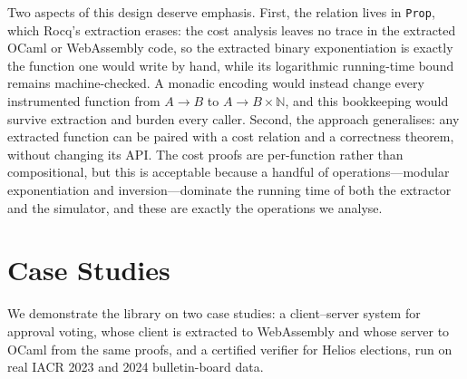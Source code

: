 \documentclass[sigconf,anonymous,review]{acmart}
\begin{document}
Two aspects of this design deserve emphasis. First, the relation \texttt{} lives in \texttt{Prop}, which Rocq's extraction erases: the cost analysis leaves no trace in the extracted OCaml or WebAssembly code, so the extracted binary exponentiation is exactly the function one would write by hand, while its logarithmic running-time bound remains machine-checked. A monadic encoding would instead change every instrumented function from $A \rightarrow B$ to $A \rightarrow B \times \mathbb{N}$, and this bookkeeping would survive extraction and burden every caller. Second, the approach generalises: any extracted function can be paired with a cost relation and a correctness theorem, without changing its API. The cost proofs are per-function rather than compositional, but this is acceptable because a handful of operations---modular exponentiation and inversion---dominate the running time of both the extractor and the simulator, and these are exactly the operations we analyse.

\section{Case Studies}\label{case_studies}
We demonstrate the library on two case studies: a client--server system for approval voting, whose client is extracted to WebAssembly and whose server to OCaml from the same proofs, and a certified verifier for Helios elections, run on real IACR 2023 and 2024 bulletin-board data.
\end{document}
